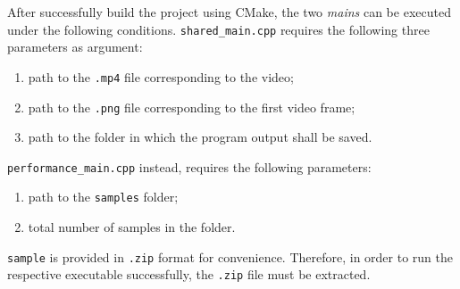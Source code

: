 \noindent
After successfully build the project using CMake, the two \textit{mains} can be executed under the following conditions.
\verb|shared_main.cpp| requires the following three parameters as argument:
\begin{enumerate}
    \item path to the \verb|.mp4| file corresponding to the video;
    \item path to the \verb|.png| file corresponding to the first video frame;
    \item path to the folder in which the program output shall be saved.
\end{enumerate}

\noindent
\verb|performance_main.cpp| instead, requires the following parameters:
\begin{enumerate}
    \item path to the \verb|samples| folder;
    \item total number of samples in the folder.
\end{enumerate}
\verb|sample| is provided in \verb|.zip| format for convenience. Therefore, in order to run the respective executable
successfully, the \verb|.zip| file must be extracted.
